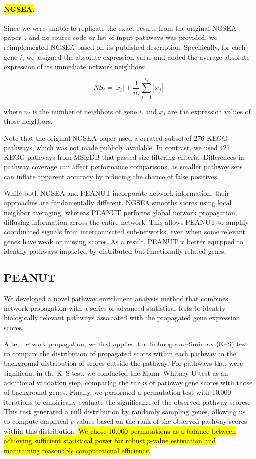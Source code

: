 \documentclass{article}
\begin{document}
\paragraph{\hl{NGSEA.}}
Since we were unable to replicate the exact results from the original NGSEA paper~\cite{Han2019}, and no source code or list of input pathways was provided, we reimplemented NGSEA based on its published description. Specifically, for each gene \(i\), we assigned the absolute expression value and added the average absolute expression of its immediate network neighbors:

\[
NS_i = |x_i| + \frac{1}{n_i} \sum_{j=1}^{n_i} |x_j|
\]

where \(n_i\) is the number of neighbors of gene \(i\), and \(x_j\) are the expression values of those neighbors.

Note that the original NGSEA paper used a curated subset of 276 KEGG pathways, which was not made publicly available. In contrast, we used 427 KEGG pathways from MSigDB that passed size filtering criteria. Differences in pathway coverage can affect performance comparisons, as smaller pathway sets can inflate apparent accuracy by reducing the chance of false positives.

While both NGSEA and PEANUT incorporate network information, their approaches are fundamentally different. NGSEA smooths scores using local neighbor averaging, whereas PEANUT performs global network propagation, diffusing information across the entire network. This allows PEANUT to amplify coordinated signals from interconnected sub-networks, even when some relevant genes have weak or missing scores. As a result, PEANUT is better equipped to identify pathways impacted by distributed but functionally related genes.

\subsection{PEANUT}
We developed a novel pathway enrichment analysis method that combines network propagation with a series of advanced statistical tests to identify biologically relevant pathways associated with the propagated gene expression scores.

After network propagation, we first applied the Kolmogorov--Smirnov (K--S) test to compare the distribution of propagated scores within each pathway to the background distribution of scores outside the pathway. For pathways that were significant in the K--S test, we conducted the Mann--Whitney U test as an additional validation step, comparing the ranks of pathway gene scores with those of background genes. Finally, we performed a permutation test with 10,000 iterations to empirically evaluate the significance of the observed pathway scores. This test generated a null distribution by randomly sampling genes, allowing us to compute empirical $p$-values based on the rank of the observed pathway scores within this distribution. \hl{ We chose 10,000 permutations as a balance between achieving sufficient statistical power for robust $p$-value estimation and maintaining reasonable computational efficiency.}
\end{document}
